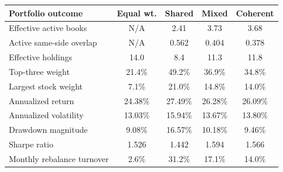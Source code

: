 \footnotesize
\begin{tabular*}{\linewidth}{@{\extracolsep{\fill}}lcccc}
\toprule
Portfolio outcome & Equal wt. & Shared & Mixed & Coherent \\
\midrule\addlinespace[2.5pt]
Effective active books & N/A & 2.41 & 3.73 & 3.68 \\
Active same-side overlap & N/A & 0.562 & 0.404 & 0.378 \\
Effective holdings & 14.0 & 8.4 & 11.3 & 11.8 \\
Top-three weight & 21.4\% & 49.2\% & 36.9\% & 34.8\% \\
Largest stock weight & 7.1\% & 21.0\% & 14.8\% & 14.0\% \\
Annualized return & 24.38\% & 27.49\% & 26.28\% & 26.09\% \\
Annualized volatility & 13.03\% & 15.94\% & 13.67\% & 13.80\% \\
Drawdown magnitude & 9.08\% & 16.57\% & 10.18\% & 9.46\% \\
Sharpe ratio & 1.526 & 1.442 & 1.594 & 1.566 \\
Monthly rebalance turnover & 2.6\% & 31.2\% & 17.1\% & 14.0\% \\
\bottomrule
\end{tabular*}
